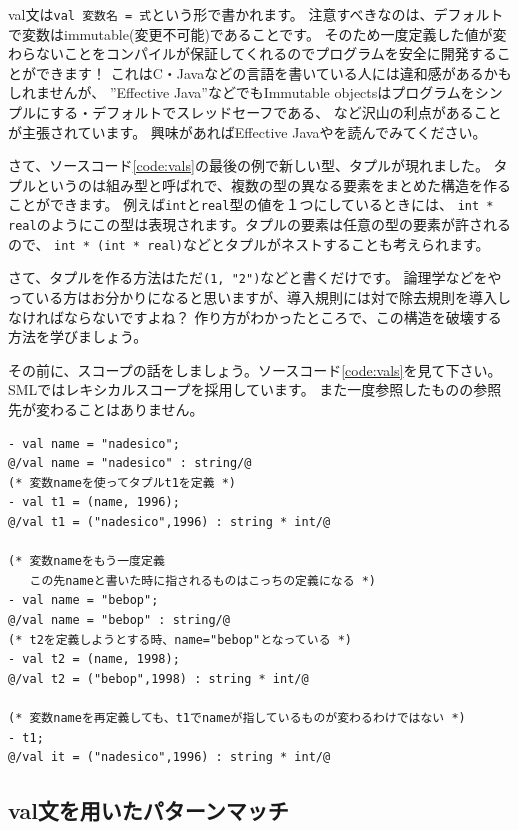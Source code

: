 \documentclass[11pt,a4paper]{article}
\begin{document}
val文は\lstinline{val 変数名 = 式}という形で書かれます。
注意すべきなのは、デフォルトで変数はimmutable(変更不可能)であることです。
そのため一度定義した値が変わらないことをコンパイルが保証してくれるのでプログラムを安全に開発することができます！
これはC・Javaなどの言語を書いている人には違和感があるかもしれませんが、
''Effective Java''などでもImmutable objectsはプログラムをシンプルにする・デフォルトでスレッドセーフである、
など沢山の利点があることが主張されています。
興味があればEffective Javaや\cite{objects-should-be-immutable}を読んでみてください。

さて、ソースコード\ref{code:vals}の最後の例で新しい型、タプルが現れました。
タプルというのは組み型と呼ばれで、複数の型の異なる要素をまとめた構造を作ることができます。
例えば\lstinline{int}と\lstinline{real}型の値を１つにしているときには、
\lstinline{int * real}のようにこの型は表現されます。タプルの要素は任意の型の要素が許されるので、
\lstinline{int * (int * real)}などとタプルがネストすることも考えられます。

さて、タプルを作る方法はただ\lstinline{(1, "2")}などと書くだけです。
論理学などをやっている方はお分かりになると思いますが、導入規則には対で除去規則を導入しなければならないですよね？
作り方がわかったところで、この構造を破壊する方法を学びましょう。

その前に、スコープの話をしましょう。ソースコード\ref{code:vals}を見て下さい。
SMLではレキシカルスコープを採用しています。
また一度参照したものの参照先が変わることはありません。

\begin{lstlisting}[caption=valのスコープ,label=code:vals]
- val name = "nadesico";
@/val name = "nadesico" : string/@
(* 変数nameを使ってタプルt1を定義 *)
- val t1 = (name, 1996);
@/val t1 = ("nadesico",1996) : string * int/@

(* 変数nameをもう一度定義
   この先nameと書いた時に指されるものはこっちの定義になる *)
- val name = "bebop";
@/val name = "bebop" : string/@
(* t2を定義しようとする時、name="bebop"となっている *)
- val t2 = (name, 1998);
@/val t2 = ("bebop",1998) : string * int/@

(* 変数nameを再定義しても、t1でnameが指しているものが変わるわけではない *)
- t1;
@/val it = ("nadesico",1996) : string * int/@
\end{lstlisting}



\subsection{val文を用いたパターンマッチ}
\end{document}
